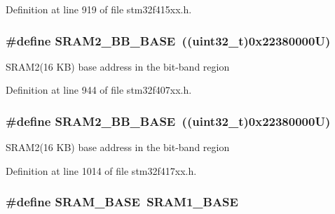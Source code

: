 Definition at line 919 of file stm32f415xx.\+h.

\subsubsection[{\texorpdfstring{S\+R\+A\+M2\+\_\+\+B\+B\+\_\+\+B\+A\+SE}{SRAM2_BB_BASE}}]{\setlength{\rightskip}{0pt plus 5cm}\#define S\+R\+A\+M2\+\_\+\+B\+B\+\_\+\+B\+A\+SE~((uint32\+\_\+t)0x22380000\+U)}\hypertarget{group___peripheral__registers__structures_gac33cb6edadf184ab9860d77089503922}{}\label{group___peripheral__registers__structures_gac33cb6edadf184ab9860d77089503922}
S\+R\+A\+M2(16 K\+B) base address in the bit-\/band region 

Definition at line 944 of file stm32f407xx.\+h.

\subsubsection[{\texorpdfstring{S\+R\+A\+M2\+\_\+\+B\+B\+\_\+\+B\+A\+SE}{SRAM2_BB_BASE}}]{\setlength{\rightskip}{0pt plus 5cm}\#define S\+R\+A\+M2\+\_\+\+B\+B\+\_\+\+B\+A\+SE~((uint32\+\_\+t)0x22380000\+U)}\hypertarget{group___peripheral__registers__structures_gac33cb6edadf184ab9860d77089503922}{}\label{group___peripheral__registers__structures_gac33cb6edadf184ab9860d77089503922}
S\+R\+A\+M2(16 K\+B) base address in the bit-\/band region 

Definition at line 1014 of file stm32f417xx.\+h.

\subsubsection[{\texorpdfstring{S\+R\+A\+M\+\_\+\+B\+A\+SE}{SRAM_BASE}}]{\setlength{\rightskip}{0pt plus 5cm}\#define S\+R\+A\+M\+\_\+\+B\+A\+SE~{\bf S\+R\+A\+M1\+\_\+\+B\+A\+SE}}\hypertarget{group___peripheral__registers__structures_ga05e8f3d2e5868754a7cd88614955aecc}{}\label{group___peripheral__registers__structures_ga05e8f3d2e5868754a7cd88614955aecc}


